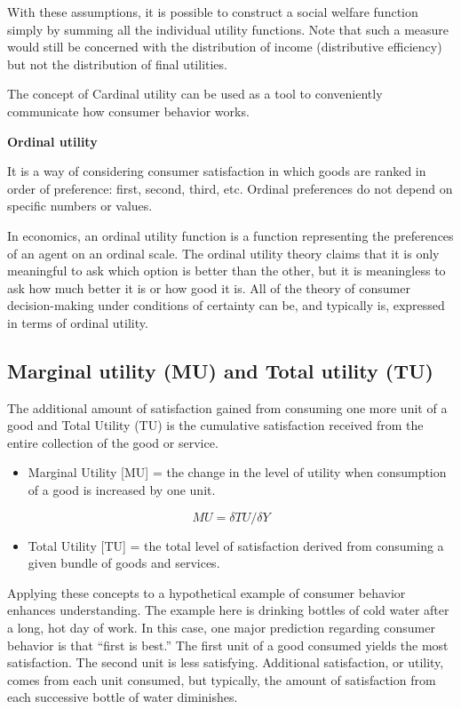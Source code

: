 \documentclass[11pt,]{book}
\providecommand{\tightlist}{%
  \setlength{\itemsep}{0pt}\setlength{\parskip}{0pt}}
\theoremstyle{definition}
\theoremstyle{definition}
\theoremstyle{definition}
\theoremstyle{remark}
\begin{document}
With these assumptions, it is possible to construct a social welfare
function simply by summing all the individual utility functions. Note
that such a measure would still be concerned with the distribution of
income (distributive efficiency) but not the distribution of final
utilities.

The concept of Cardinal utility can be used as a tool to conveniently
communicate how consumer behavior works.

\textbf{Ordinal utility}

It is a way of considering consumer satisfaction in which goods are
ranked in order of preference: first, second, third, etc. Ordinal
preferences do not depend on specific numbers or values.

In economics, an ordinal utility function is a function representing the
preferences of an agent on an ordinal scale. The ordinal utility theory
claims that it is only meaningful to ask which option is better than the
other, but it is meaningless to ask how much better it is or how good it
is. All of the theory of consumer decision-making under conditions of
certainty can be, and typically is, expressed in terms of ordinal
utility.

\subsection{Marginal utility (MU) and Total utility
(TU)}\label{marginal-utility-mu-and-total-utility-tu}

The additional amount of satisfaction gained from consuming one more
unit of a good and Total Utility (TU) is the cumulative satisfaction
received from the entire collection of the good or service.

\begin{itemize}
\tightlist
\item
  Marginal Utility {[}MU{]} = the change in the level of utility when
  consumption of a good is increased by one unit.
\end{itemize}

\[MU = \delta TU/\delta Y\]

\begin{itemize}
\tightlist
\item
  Total Utility {[}TU{]} = the total level of satisfaction derived from
  consuming a given bundle of goods and services.
\end{itemize}

Applying these concepts to a hypothetical example of consumer behavior
enhances understanding. The example here is drinking bottles of cold
water after a long, hot day of work. In this case, one major prediction
regarding consumer behavior is that ``first is best.'' The first unit of
a good consumed yields the most satisfaction. The second unit is less
satisfying. Additional satisfaction, or utility, comes from each unit
consumed, but typically, the amount of satisfaction from each successive
bottle of water diminishes.
\end{document}
